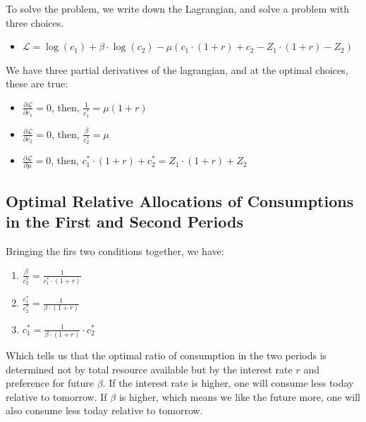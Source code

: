 \documentclass[
]{book}
\providecommand{\tightlist}{%
  \setlength{\itemsep}{0pt}\setlength{\parskip}{0pt}}
\begin{document}
To solve the problem, we write down the Lagrangian, and solve a problem
with three choices.

\begin{itemize}
\tightlist
\item
  \(\displaystyle \mathcal{L}=\log (c_1 )+\beta \cdot \log (c_2 )-\mu \left(c_1 \cdot (1+r)+c_2 -Z_1 \cdot (1+r)-Z_2 \right)\)
\end{itemize}

We have three partial derivatives of the lagrangian, and at the optimal
choices, these are true:

\begin{itemize}
\item
  \(\frac{\partial \mathcal{L}}{\partial c_1 }=0\), then,
  \(\frac{1}{c_1^{\ast } }=\mu (1+r)\)
\item
  \(\frac{\partial \mathcal{L}}{\partial c_2 }=0\), then,
  \(\frac{\beta }{c_2^{\ast } }=\mu\)
\item
  \(\frac{\partial \mathcal{L}}{\partial \mu }=0\), then,
  \(c_1^{\ast } \cdot (1+r)+c_2^{\ast } =Z_1 \cdot (1+r)+Z_2\)
\end{itemize}

\hypertarget{optimal-relative-allocations-of-consumptions-in-the-first-and-second-periods}{%
\subsection{Optimal Relative Allocations of Consumptions in the First and Second Periods}\label{optimal-relative-allocations-of-consumptions-in-the-first-and-second-periods}}

Bringing the firs two conditions together, we have:

\begin{enumerate}
\def\labelenumi{\arabic{enumi}.}
\item
  \(\displaystyle \frac{\beta }{c_2^{\ast } }=\frac{1}{c_1^{\ast } \cdot (1+r)}\)
\item
  \(\displaystyle \frac{c_1^{\ast } }{c_2^{\ast } }=\frac{1}{\beta \cdot (1+r)}\)
\item
  \(\displaystyle c_1^{\ast } =\frac{1}{\beta \cdot (1+r)}\cdot c_2^{\ast }\)
\end{enumerate}

Which tells us that the optimal ratio of consumption in the two periods
is determined not by total resource available but by the interest rate
\(r\) and preference for future \(\beta\). If the interest rate is higher,
one will consume less today relative to tomorrow. If \(\beta\) is higher,
which means we like the future more, one will also consume less today
relative to tomorrow.
\end{document}
